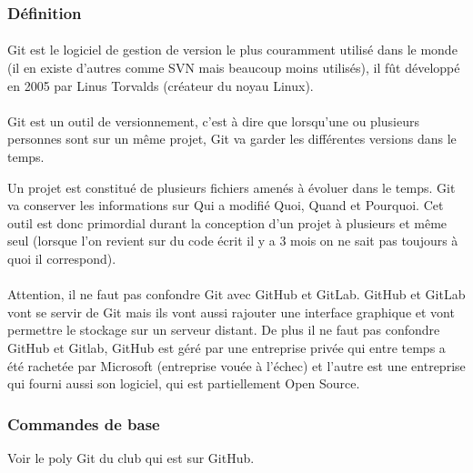 \subsubsection{Définition}

\paragraph{} Git est le logiciel de gestion de version le plus couramment
utilisé dans le monde (il en existe d'autres comme SVN mais beaucoup moins
utilisés), il fût développé en 2005 par Linus Torvalds (créateur du noyau
Linux).

\paragraph{} Git est un outil de versionnement, c'est à dire que lorsqu'une ou
plusieurs personnes sont sur un même projet, Git va garder les différentes
versions dans le temps.

Un projet est constitué de plusieurs fichiers amenés à évoluer dans le temps.
Git va conserver les informations sur Qui a modifié Quoi, Quand et Pourquoi.
Cet outil est donc primordial durant la conception d'un projet à plusieurs et
même seul (lorsque l'on revient sur du code écrit il y a 3 mois on ne sait pas
toujours à quoi il correspond).

\paragraph{} Attention, il ne faut pas confondre Git avec GitHub et GitLab.
GitHub et GitLab vont se servir de Git mais ils vont aussi rajouter une
interface graphique et vont permettre le stockage sur un serveur distant. De
plus il ne faut pas confondre GitHub et Gitlab, GitHub est géré par une
entreprise privée qui entre temps a été rachetée par Microsoft (entreprise
vouée à l'échec) et l'autre est une entreprise qui fourni aussi son logiciel,
qui est partiellement Open Source.

\subsubsection{Commandes de base}

Voir le poly Git du club qui est sur GitHub.
